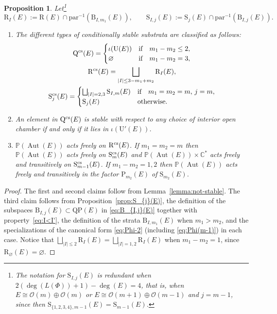 \documentclass[pdftex]{sigma}
\newcommand{\field}[1]{\ensuremath{\mathbb{#1}}}
\newcommand{\CC}{\field{C}}
\newcommand{\PP}{\field{P}}
\newcommand{\calO}{\mathcal{O}}
\DeclareMathOperator{\Aut}{Aut}
\numberwithin{equation}{section}
\newtheorem{Proposition}[Theorem]{Proposition}
 { \theoremstyle{definition}
\newtheorem{Definition}[Theorem]{Definition}
\newtheorem{Note}[Theorem]{Note}
\newtheorem{Example}[Theorem]{Example}
\newtheorem{Remark}[Theorem]{Remark} }
\begin{document}
\begin{Proposition}\label{prop:CS}
Let\footnote{The notation for $\mathrm{S}_{I,j}(E)$ is redundant when $2(\deg(L(\Phi)) +1) - \deg(E) = 4$, that is, when $E\cong\calO(m)\oplus\calO(m)$ or $E\cong\calO(m+1)\oplus\calO(m-1)$ and $j=m-1$, since then $\mathrm{S}_{\{1,2,3,4\},m-1}(E) = \mathrm{S}_{m-1}(E)$.}
\[
\mathrm{R}_{I}(E):=\mathrm{R}(E)\cap \mathrm{par}^{-1}(\mathrm{B}_{I,m_{1}}(E)),\qquad
\mathrm{S}_{I,j}(E):=\mathrm{S}_{j}(E)\cap\mathrm{par}^{-1}(\mathrm{B}_{I,j}(E)).
\]
\begin{enumerate}\itemsep=0pt
\item[$(i)$] The different types of conditionally stable substrata are classified as follows:
\begin{gather*}
\mathrm{Q}^{\rm cs}(E)=
\begin{cases}
\iota(\mathrm{U}(E)) & \text{if} \quad m_{1} - m_{2} \leq 2,
\\
\varnothing & \text{if} \quad m_{1} -m_{2} = 3,
\end{cases}
\\
\mathrm{R}^{\rm cs}(E)=
\bigsqcup_{\vert I\vert \leq 3-m_{1}+m_{2}}\mathrm{R}_{I}(E),
\\
\mathrm{S}^{\rm cs}_{j}(E)=
\begin{cases}
\bigsqcup_{\vert I\vert = 2,3}\mathrm{S}_{I,m}(E) & \text{if} \quad m_{1} = m_{2}=m,\, j=m,
\\
\mathrm{S}_{j}(E) & \text{otherwise.}
\end{cases}
\end{gather*}
\item[$(ii)$] An element in $\mathrm{Q}^{\rm cs}(E)$ is stable with respect to any choice of interior open chamber if and only if it lies in $\iota(\mathrm{U}'(E))$.
\item[$(iii)$] $\PP(\Aut(E))$ acts freely on $\mathrm{R}^{\rm cs}(E)$. If $m_{1}=m_{2}=m$ then $\PP(\Aut(E))$ acts freely on $\mathrm{S}^{\rm cs}_{m}(E)$ and $\PP(\Aut(E))\times \CC^{*}$ acts freely and transitively on $\mathrm{S}^{\rm cs}_{m-1}(E)$. If $m_{1}-m_{2}=1,2$ then $\PP(\Aut(E))$ acts freely and transitively in the factor $\mathrm{P}_{m_{2}}(E)$ of $\mathrm{S}_{m_{2}}(E)$.
 \end{enumerate}
\end{Proposition}

\begin{proof}
The first and second claims follow from Lemma~\ref{lemma:not-stable}. The third claim follows from Proposition~\ref{prop:S_{j}(E)}, the definition of the subspaces $\mathrm{B}_{I,j}(E)\subset \mathrm{QP}(E)$ in \eqref{eq:B_{I,j}(E)} together with property~\eqref{eq:I<I'}, the definition of the strata $\mathrm{B}_{I,m_{1}}(E)$ when $m_{1}>m_{2}$, and the specializations of the canonical form \eqref{eq:Phi-2} (including \eqref{eq:Phi(m-1)}) in each case. Notice that $\bigsqcup_{\vert I\vert \leq 2}\mathrm{R}_{I}(E) = \bigsqcup_{\vert I\vert =1,2}\mathrm{R}_{I}(E)$ when $m_{1}-m_{2} =1$, since $\mathrm{R}_{\varnothing }(E) = \varnothing $.
\end{proof}
\end{document}
